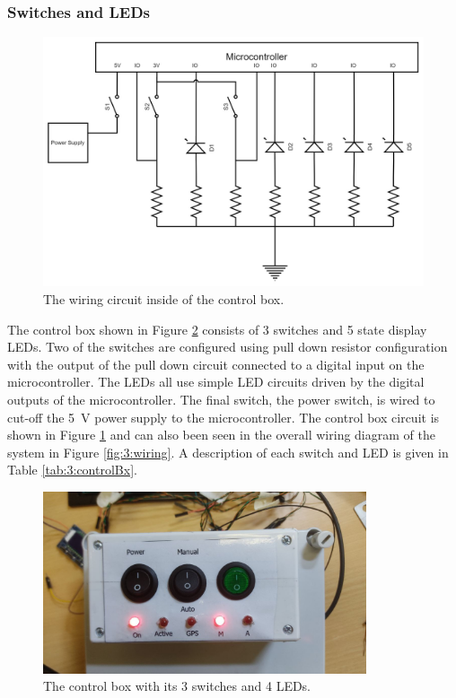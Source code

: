 	\subsubsection{Switches and LEDs}
	\begin{figure}
		\begin{center}
			\includegraphics[width=0.65\linewidth]{figures/BoxCircuit}
			\caption{The wiring circuit inside of the control box.}
			\label{fig:3:controlCircuit}
		\end{center}
	\end{figure}
	The control box shown in Figure \ref{fig:3:controlBox} consists of 3 switches and 5 state display LEDs. Two of the switches are configured using pull down resistor configuration with the output of the pull down circuit connected to a digital input on the microcontroller. The LEDs all use simple LED circuits driven by the digital outputs of the microcontroller. The final switch, the power switch, is wired to cut-off the \SI{5}{\volt} power supply to the microcontroller. The control box circuit is shown in Figure \ref{fig:3:controlCircuit} and can also been seen in the overall wiring diagram of the system in Figure \ref{fig:3:wiring}. A description of each switch and LED is given in Table \ref{tab:3:controlBx}.
	\begin{figure}[hb]
		\begin{center}
			\includegraphics[width = 0.85\textwidth]{figures/controlBox.jpg}
			\caption{The control box with its 3 switches and 4 LEDs.}
			\label{fig:3:controlBox}
		\end{center}
	\end{figure}
